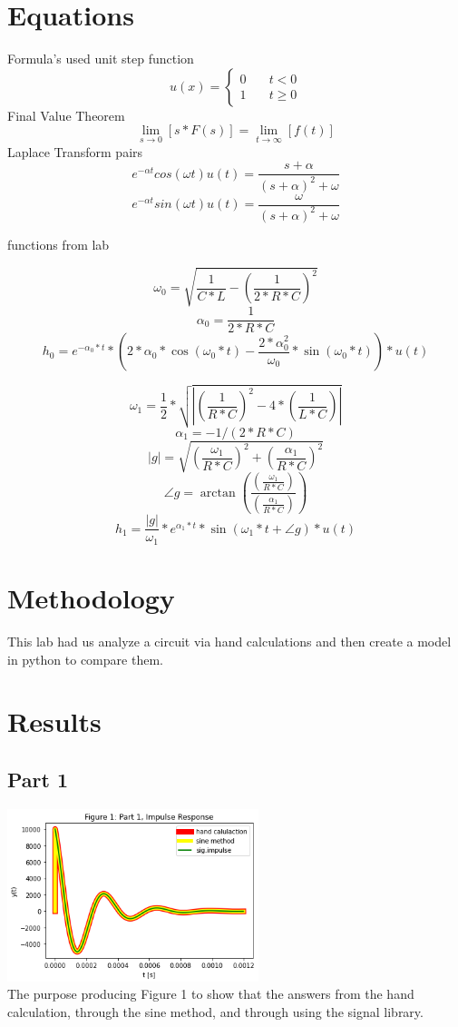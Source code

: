 \documentclass[12pt,a4paper]{article}
\begin{document}
\section{Equations}\label{sec:lit-rev}
Formula's used
unit step function
\[
u(x) = \left\{
        \begin{array}{ll}
            0 & \quad t < 0 \\
            1 & \quad t \geq 0
        \end{array}
    \right.
\]
Final Value Theorem
\[
\lim _{s \to 0} \left [ s*F(s) \right] = \lim _{t \to \infty} \left [ f(t) \right]
\]
Laplace Transform pairs
\[e^{-\alpha t} cos(\omega t) u(t) = \frac {s+\alpha} {(s+\alpha)^2 + \omega}\]
\[e^{-\alpha t} sin(\omega t) u(t) = \frac {\omega} {(s+\alpha)^2 + \omega}\]

functions from lab


\[\omega_0 = \sqrt{ \frac {1} {C*L}-\left (\frac {1} {2*R*C} \right)^2}\]
\[\alpha_0 = \frac 1 {2*R*C}\] 
\[h_0 = e^{-\alpha_0*t}*\left(2*\alpha_0*\cos(\omega_0*t)-\frac {2*\alpha_0^2} {\omega_0}*\sin(\omega_0*t) \right)*u(t)\]


\[\omega_1 = \frac {1} {2} *\sqrt{\left| \left(\frac {1} {R*C} \right)^2-4*\left( \frac {1} {L*C} \right) \right|}\]
\[\alpha_1 = -1/(2*R*C)\]
\[|g| = \sqrt{\left(\frac {\omega_1} {R*C}\right)^2+\left(\frac{\alpha_1} {R*C} \right)^2}\]
\[\angle g = \arctan \left( \frac{\left (\frac {\omega_1}{R*C}\right)}{\left (\frac {\alpha_1} {R*C} \right)} \right)\]
\[h_1 = \frac{|g|}{\omega_1}*e^{\alpha_1*t}*\sin(\omega_1*t+\angle g)*u(t)\]


\section{Methodology}\label{sec:meth}
This lab had us analyze a circuit via hand calculations and then create a model in python to compare them.

\section{Results}\label{sec:res}
\subsection*{Part 1}

\includegraphics[width=0.55\textwidth]{Figure1.png}\\
The purpose producing Figure 1 to show that the answers from the hand calculation, through the sine method, and through using the signal library.
\end{document}
